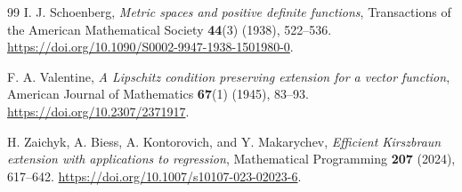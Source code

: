 \documentclass[11pt]{article}
\numberwithin{equation}{section}
\theoremstyle{definition}
\theoremstyle{remark}
\begin{document}
\begin{thebibliography}{99}
I. J. Schoenberg,
\emph{Metric spaces and positive definite functions},
Transactions of the American Mathematical Society \textbf{44}(3) (1938),
522--536.
\url{https://doi.org/10.1090/S0002-9947-1938-1501980-0}.

F. A. Valentine,
\emph{A Lipschitz condition preserving extension for a vector function},
American Journal of Mathematics \textbf{67}(1) (1945), 83--93.
\url{https://doi.org/10.2307/2371917}.

H. Zaichyk, A. Biess, A. Kontorovich, and Y. Makarychev,
\emph{Efficient Kirszbraun extension with applications to regression},
Mathematical Programming \textbf{207} (2024), 617--642.
\url{https://doi.org/10.1007/s10107-023-02023-6}.

\end{thebibliography}
\end{document}
